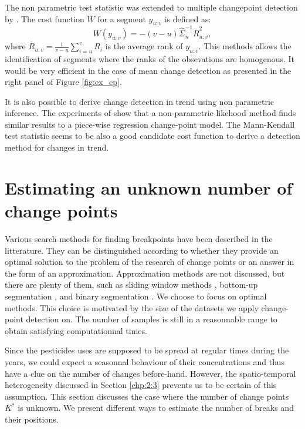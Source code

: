 The non parametric test statistic was extended to multiple changepoint detection by \cite{lung2015}. The cost function $W$ for a segment $y_{u:v}$ is defined as: 
\begin{equation}\label{chp2:costfuncnp}
  W(y_{u:v}) = -(v-u)\hat{\Sigma}^{-1}_n\overline{R}^2_{u:v},
\end{equation}
where $\overline{R}_{u:v} = \frac{1}{v-u}\sum_{i = u}^vR_i$ is the average rank of $y_{u:v}$.
This methods allows the identification of segments where the ranks of the obsevations are homogenous. It would be very efficient in the case of mean change detection as presented in the right panel of Figure \ref{fig:ex_cp}.  

It is also possible to derive change detection in trend using non parametric inference. The experiments of \cite{Haynes2016} show that a non-parametric likehood method finds similar results to a piece-wise regression change-point model. The Mann-Kendall test statistic \cite{Pohlert2020,1994a} seems to be also a good candidate cost function to derive a detection method for changes in trend.  

\section{Estimating an unknown number of change points}\label{chp:3:2}

Various search methods for finding breakpoints have been described in the litterature. They can be distinguished according to whether they provide an optimal solution to the problem of the research of change points or an answer in the form of an approximation. Approximation methods are not discussed, but there are plenty of them, such as sliding window methods \cite{Li2010,Liu2022}, bottom-up segmentation \cite{chen1998speaker}, and binary segmentation \cite{Yang2001,Fryzlewicz2014}. We choose to focus on optimal methods. This choice is motivated by the size of the datasets we apply change-point detection on. The number of samples is still in a reasonnable range to obtain satisfying computationnal times.  

Since the pesticides uses are supposed to be spread at regular times during the years, we could expect a seasonnal behaviour of their concentrations and thus have a clue on the number of changes before-hand. However, the spatio-temporal heterogeneity discussed in Section \ref{chp:2:3} prevents us to be certain of this assumption. This section discusses the case where the number of change points $K^*$ is unknown. We present different ways to estimate the number of breaks and their positions.  

